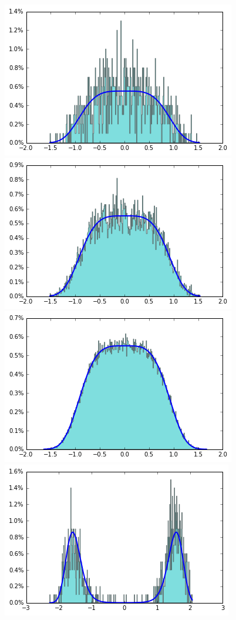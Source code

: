\documentclass[final]{beamer}
\newlength{\onecolwid}
\begin{document}
\begin{frame}[t]
\begin{columns}[t]
\begin{column}{\onecolwid}
\begin{figure}
    \centering
    \includegraphics[width=.3\onecolwid]{../figure/case1_step_0.005_iter_1e3.png}
    \includegraphics[width=.3\onecolwid]{../figure/case1_step_0.005_iter_1e4.png}
    \includegraphics[width=.3\onecolwid]{../figure/case1_step_0.005_iter_1e5.png}\\
    \includegraphics[width=.3\onecolwid]{../figure/case2_step_0.005_iter_1e3.png}

\end{figure}
\end{column}
\end{columns}
\end{frame}
\end{document}
